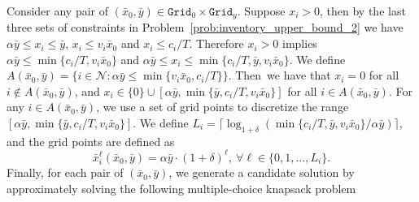 \documentclass[mnsc,non-blindrev]{informs3}
\theoremstyle{definition}
\begin{document}
\begin{appendices}{\Large{}}
Consider any pair of $(\bar{x}_0,\bar{y})\in\texttt{Grid}_0\times\texttt{Grid}_y$. Suppose $x_i>0$, then by the last three sets of constraints in Problem~\eqref{prob:inventory_upper_bound_2} we have $\alpha\bar{y}\leq x_i\leq\bar{y}$, $x_i\leq v_i\bar{x}_0$ and $x_i\leq c_i/T$. Therefore $x_i>0$ implies $\alpha\bar{y}\leq \min\{c_i/T,v_i\bar{x}_0\}$ and $\alpha\bar{y}\leq x_i\leq \min\{c_i/T,\bar{y},v_i\bar{x}_0\}$. We define \mbox{$A(\bar{x}_0,\bar{y})=\{i\in\mathcal{N}:\alpha\bar{y}\leq \min\{v_i\bar{x}_0,c_i/T\}\}$}. Then~we have that $x_i=0$ for all \mbox{$i\notin A(\bar{x}_0,\bar{y})$,} and \mbox{$x_i\in\{0\}\cup[\alpha\bar{y},\min\{\bar{y},c_i/T,v_i\bar{x}_0\}]$} for all \mbox{$i\in A(\bar{x}_0,\bar{y})$}. For any $i\in A(\bar{x}_0,\bar{y})$, we use a set of grid points to discretize the range $[\alpha\bar{y},\min\{\bar{y},c_i/T,v_i\bar{x}_0\}]$. We define \mbox{$L_i=\lceil\log_{1+\delta}(\min\{c_i/T,\bar{y},v_i\bar{x}_0\}/\alpha\bar{y})\rceil$,} and the grid points are defined as
\begin{equation*}
\bar{x}_i^\ell(\bar{x}_0,\bar{y})=\alpha\bar{y}\cdot(1+\delta)^\ell,\ \forall\ell\in\{0,1,\dots,L_i\}.
\end{equation*}
Finally, for each pair of $(\bar{x}_0,\bar{y})$, we generate a candidate solution by approximately solving the following multiple-choice knapsack problem


\end{appendices}
\end{document}

